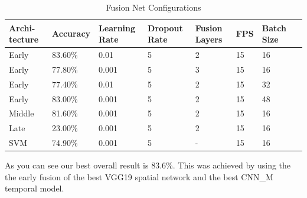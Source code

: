 \begin{table}[H]
\centering
\caption{Fusion Net Configurations}
\label{table:fusion_results}
\begin{tabularx}{\textwidth}{XXXXXXXX}
\toprule
Archi- tecture 		&  Accuracy	& Learning Rate 	& Dropout Rate	& Fusion Layers	& FPS & Batch Size \\ \midrule
Early  & 83.60\%  & 0.01  & 5 & 2 & 15 & 16 \\
Early  & 77.80\%  & 0.001 & 5 & 3 & 15 & 16 \\
Early  & 77.40\%  & 0.01  & 5 & 2 & 15 & 32 \\
Early  & 83.00\%  & 0.001 & 5 & 2 & 15 & 48 \\
Middle & 81.60\%  & 0.001 & 5 & 2 & 15 & 16 \\
Late   & 23.00\%  & 0.001 & 5 & 2 & 15 & 16 \\
SVM    & 74.90\%  & 0.001 & 5 & - & 15 & 16 \\
\bottomrule
\end{tabularx}
\end{table}

As you can see our best overall result is 83.6\%.
This was achieved by using the the early fusion of the best VGG19 spatial network and the best CNN\_M temporal model.